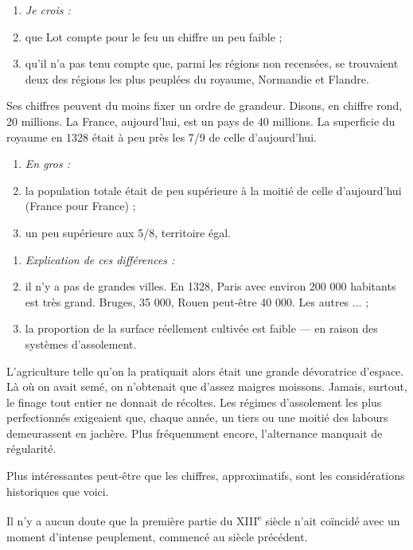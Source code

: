 \documentclass[french,twoside]{book} %
\newlength{\listmod}
\newcommand{\listhead}[1]{\hspace{-1\listmod}\emph{#1}}
\begin{document}
\begin{enumerate}[itemsep=0pt,]
\item[]\listhead{Je crois :}
\item que Lot compte pour le feu un chiffre un peu faible ;
\item qu’il n’a pas tenu compte que, parmi les régions non recensées, se trouvaient deux des régions les plus peuplées du royaume, Normandie et Flandre.

\end{enumerate}\noindent Ses chiffres peuvent du moins fixer un ordre de grandeur. Disons, en chiffre rond, 20 millions. La France, aujourd’hui, est un pays de 40 millions. La superficie du royaume en 1328 était à peu près les 7/9 de celle d’aujourd’hui.\par

\begin{enumerate}[itemsep=0pt,]
\item[]\listhead{En gros :}
\item la population totale était de peu supérieure à la moitié de celle d’aujourd’hui (France pour France) ;
\item un peu supérieure aux 5/8, territoire égal.

\end{enumerate} 
\label{p9}
\begin{enumerate}[itemsep=0pt,]
\item[]\listhead{Explication de ces différences :}
\item il n’y a pas de grandes villes. En 1328, Paris avec environ 200 000 habitants est très grand. Bruges, 35 000, Rouen peut-être 40 000. Les autres ... ;
\item la proportion de la surface réellement cultivée est faible — en raison des systèmes d’assolement.

\end{enumerate}\noindent L’agriculture telle qu’on la pratiquait alors était une grande dévoratrice d’espace. Là où on avait semé, on n’obtenait que d’assez maigres moissons. Jamais, surtout, le finage tout entier ne donnait de récoltes. Les régimes d’assolement les plus perfectionnés exigeaient que, chaque année, un tiers ou une moitié des labours demeurassent en jachère. Plus fréquemment encore, l’alternance manquait de régularité.\par
Plus intéressantes peut-être que les chiffres, approximatifs, sont les considérations historiques que voici.\par
Il n’y a aucun doute que la première partie du XIII\textsuperscript{e} siècle n’ait coïncidé avec un moment d’intense peuplement, commencé au siècle précédent.\par
\end{document}
